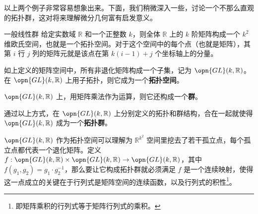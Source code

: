 以上两个例子非常容易想象出来。下面，我们稍微深入一些，讨论一个不那么直观的拓扑群，这对将来理解微分几何富有启发意义。


\begin{example}{一般线性群}\label{ex_TopGrp_2}
给定实数域 $\mathbb{R}$ 和一个正整数 $k$，则全体 $\mathbb{R}$ 上的 $k$ 阶矩阵构成一个 $k^2$ 维欧氏空间，也就是一个拓扑空间。对于这个空间中的每个点（也就是矩阵），其第 $i$ 行 $j$ 列的矩阵元就是该点在第 $k(i-1)+j$ 个坐标轴上的分量。

如上定义的矩阵空间中，所有非退化矩阵构成一个子集，记为 $\opn{GL}(k, \mathbb{R})$。在 $\opn{GL}(k,\mathbb{R})$ 上用子拓扑，则它成为一个\textbf{拓扑空间}。

$\opn{GL}(k,\mathbb{R})$ 上，用矩阵乘法作为运算，则它还构成一个\textbf{群}。

通过以上方式，在 $\opn{GL}(k, \mathbb{R})$ 上分别定义的拓扑和群结构，合在一起就使得 $\opn{GL}(k, \mathbb{R})$ 成为一个\textbf{拓扑群}。
\end{example}

$\opn{GL}(k, \mathbb{R})$ 作为拓扑空间可以理解为 $\mathbb{R}^{k^2}$ 空间里挖去了若干孤立点，每个孤立点都代表一个退化矩阵。定义 $f:\opn{GL}(k, \mathbb{R})\times\opn{GL}(k, \mathbb{R})\to\opn{GL}(k, \mathbb{R})$，其中 $f(g_1, g_2)=g_1\cdot g_2^{-1}$，那么要让它构成拓扑群就必须满足 $f$ 是一个连续映射，使得这一点成立的关键在于行列式是矩阵空间的连续函数，以及行列式的积性\footnote{即矩阵乘积的行列式等于矩阵行列式的乘积。}。







